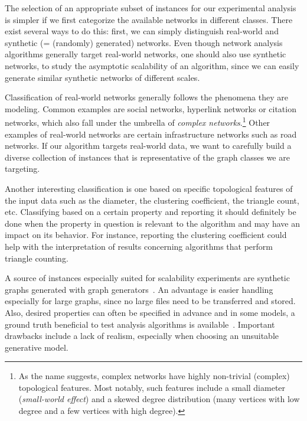 \documentclass[algorithms,article,submit,moreauthors,pdftex]{Definitions/mdpi}
\newcommand{\changed}[1]{#1}
\newcommand{\removed}[1]{}
\begin{document}
The selection of an appropriate subset of instances for our experimental analysis is simpler if we first categorize the available networks in different classes.
There exist several ways to do this:
first, we can simply distinguish real-world and synthetic (= (randomly) generated) networks.
Even though network analysis algorithms generally target real-world networks, one should also use synthetic
networks, \eg to study the asymptotic scalability of an algorithm, since we can easily generate similar synthetic
networks of different scales.

Classification of real-world networks generally follows the phenomena they are modeling.
Common examples are social networks, hyperlink networks or citation networks, which also fall under the umbrella of \emph{complex networks}.\footnote{As the name suggests, complex networks have highly non-trivial (complex) topological features.
Most notably, such features include a small diameter (\emph{small-world effect}) and a skewed degree distribution
(many vertices with low degree and a few vertices with high degree).
%
}
\changed{Other examples} of real-world \removed{non-complex} networks are certain infrastructure networks such as road networks.
If our algorithm targets real-world data, we want to carefully build a diverse collection of instances that is
representative of the graph classes we are targeting.

Another interesting classification is one based on specific topological features of the input data
such as the diameter, the clustering coefficient, the triangle count, etc. Classifying based on a certain
property and reporting it should definitely be done when the property in question is relevant to the
algorithm and may have an impact on its behavior. For instance,
reporting the clustering coefficient could help with the interpretation of results
concerning algorithms that perform triangle counting.

A source of instances especially suited for scalability experiments are synthetic graphs generated with graph generators~\cite{goldenberg2010survey}.
An advantage is easier handling especially for large graphs, since no large files need to be transferred and stored.
Also, desired properties can often be specified in advance and in some models, a ground truth beneficial to test analysis algorithms is available\changed{~\cite{lancichinetti2008benchmark}}.
Important drawbacks include a lack of realism, especially when choosing an unsuitable generative model.
\end{document}
